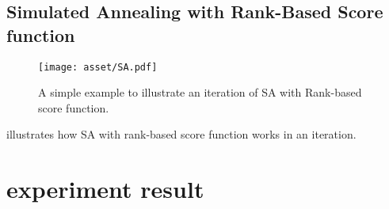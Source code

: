 \documentclass[sigconf]{acmart}
\begin{document}
    \subsection{Simulated Annealing with Rank-Based Score function}

    

    \begin{figure*}[htb]
        \centering
        \hspace*{-\baselineskip}
        \vspace*{-\baselineskip}
        \texttt{[image: asset/SA.pdf]}
        \caption{A simple example to illustrate an iteration of SA with Rank-based score function.}
        \label{fig:SA}
    \end{figure*}

     illustrates how SA with rank-based score function works in an iteration. 

    \section{experiment result}
    \label{sec:results}
\end{document}

